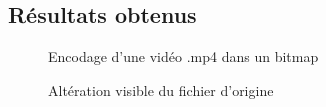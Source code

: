 \subsection{Résultats obtenus}
\begin{figure}[H]
    \centering
    \hfill
    \caption{Encodage d'une vidéo .mp4 dans un bitmap}
    \caption{Altération visible du fichier d'origine}
\end{figure}
